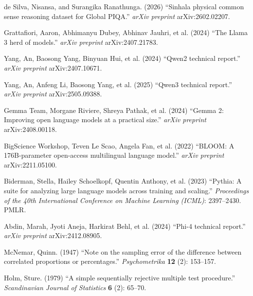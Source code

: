 de Silva, Nisansa, and Surangika Ranathunga. (2026) ``Sinhala physical common sense reasoning dataset for Global PIQA.'' {\it arXiv preprint} arXiv:2602.02207.

Grattafiori, Aaron, Abhimanyu Dubey, Abhinav Jauhri, et al. (2024) ``The Llama 3 herd of models.'' {\it arXiv preprint} arXiv:2407.21783.

Yang, An, Baosong Yang, Binyuan Hui, et al. (2024) ``Qwen2 technical report.'' {\it arXiv preprint} arXiv:2407.10671.

Yang, An, Anfeng Li, Baosong Yang, et al. (2025) ``Qwen3 technical report.'' {\it arXiv preprint} arXiv:2505.09388.

Gemma Team, Morgane Riviere, Shreya Pathak, et al. (2024) ``Gemma 2: Improving open language models at a practical size.'' {\it arXiv preprint} arXiv:2408.00118.

BigScience Workshop, Teven Le Scao, Angela Fan, et al. (2022) ``BLOOM: A 176B-parameter open-access multilingual language model.'' {\it arXiv preprint} arXiv:2211.05100.

Biderman, Stella, Hailey Schoelkopf, Quentin Anthony, et al. (2023) ``Pythia: A suite for analyzing large language models across training and scaling.'' {\it Proceedings of the 40th International Conference on Machine Learning (ICML)}: 2397--2430. PMLR.

Abdin, Marah, Jyoti Aneja, Harkirat Behl, et al. (2024) ``Phi-4 technical report.'' {\it arXiv preprint} arXiv:2412.08905.

McNemar, Quinn. (1947) ``Note on the sampling error of the difference between correlated proportions or percentages.'' {\it Psychometrika} {\bf 12} (2): 153--157.

Holm, Sture. (1979) ``A simple sequentially rejective multiple test procedure.'' {\it Scandinavian Journal of Statistics} {\bf 6} (2): 65--70.
